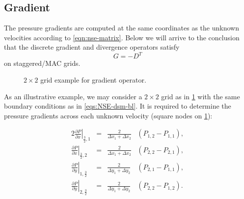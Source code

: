 \documentclass{article}
\numberwithin{equation}{section}
\begin{document}
\subsection{Gradient}\label{subsec:gradient} 

The pressure gradients are computed at the same coordinates as the unknown velocities according to \cref{eqn:nse-matrix}. Below we will arrive to the conclusion that the discrete gradient and divergence operators satisfy
\begin{equation}\label{eqn:g-dt}
  {G}=-{D^T}
\end{equation}
on staggered/MAC grids. 

\begin{figure}[H] %
  \caption{$2\times 2$ grid example for gradient operator.}\label{fig:G-example-2x2}
\end{figure}


As an illustrative example, we may consider a $2\times 2$ grid as in \cref{fig:G-example-2x2} with the same boundary conditions as in \cref{eqs:NSE-dsm-bl}. It is required to determine the pressure gradients across each unknown velocity (square nodes on \cref{fig:G-example-2x2}):

\begin{alignat*}{2}
	\left.\frac{\partial P}{\partial x}\right|_{\frac{3}{2},1} &=&	\frac{2}{{\Delta x_1 + \Delta x_2}}&\left(P_{1,2}-P_{1,1}\right),\\
	\left.\frac{\partial P}{\partial x}\right|_{\frac{3}{2},2} &=&	\frac{2}{{\Delta x_1 + \Delta x_2}}&\left( P_{2,2}-P_{2,1} \right),\\
	\left.\frac{\partial P}{\partial y}\right|_{1,\frac{3}{2}} &=&	\frac{2}{{\Delta y_1 + \Delta y_2}}&\left(P_{2,1}-P_{1,1} \right),\\
	\left.\frac{\partial P}{\partial y}\right|_{2,\frac{3}{2}} &=&	\frac{2}{{\Delta y_1 + \Delta y_2}}&\left( P_{2,2}-P_{1,2} \right).
\end{alignat*}
\end{document}
